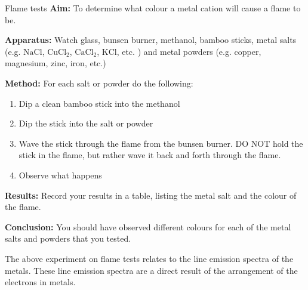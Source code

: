 \begin{g_experiment}{Flame tests}
            \nopagebreak
            \label{m38741*eip-699}\noindent{}\textbf{Aim:}\newline
    To determine what colour a metal cation will cause a flame to be.


\label{m38741*eip-6991}\noindent{}\textbf{Apparatus:}\newline
    Watch glass, bunsen burner, methanol, bamboo sticks, metal salts (e.g. $\mathrm{NaCl}$, ${\mathrm{CuCl}}_{2}$, ${\mathrm{CaCl}}_{2}$, $\mathrm{KCl}$, etc. ) and metal powders (e.g. copper, magnesium, zinc, iron, etc.)

      

\label{m38741*eip-6992}\noindent{}\textbf{Method:}\newline
    For each salt or powder do the following: \label{m38741*id7092}\begin{enumerate}[noitemsep, label=\textbf{\arabic*}. ] 
            \item Dip a clean bamboo stick into the methanol\item Dip the stick into the salt or powder\item Wave the stick through the flame from the bunsen burner. DO NOT hold the stick in the flame, but rather wave it back and forth through the flame.\item Observe what happens\end{enumerate}
\par 
\label{m38741*eip-6993}\noindent{}\textbf{Results:}\newline
    Record your results in a table, listing the metal salt and the colour of the flame.
\par 
\label{m38741*eip-6994}\noindent{}\textbf{Conclusion:}\newline
    You should have observed different colours for each of the metal salts and powders that you tested.
\end{g_experiment}
The above experiment on flame tests relates to the line emission spectra of the metals. These line emission spectra are a direct result of the arrangement of the electrons in metals.\par \label{m38741*secfhsst!!!underscore!!!id766}


